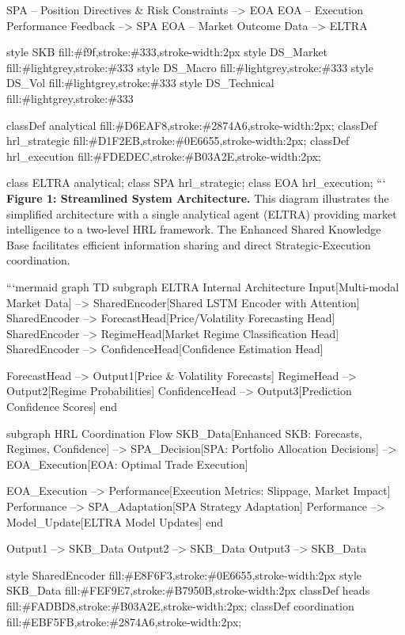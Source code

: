 \documentclass[11pt,a4paper]{article}
\begin{document}
    SPA -- Position Directives \& Risk Constraints --> EOA
    EOA -- Execution Performance Feedback --> SPA
    EOA -- Market Outcome Data --> ELTRA

    style SKB fill:\#f9f,stroke:\#333,stroke-width:2px
    style DS\_Market fill:\#lightgrey,stroke:\#333
    style DS\_Macro fill:\#lightgrey,stroke:\#333
    style DS\_Vol fill:\#lightgrey,stroke:\#333
    style DS\_Technical fill:\#lightgrey,stroke:\#333

    classDef analytical fill:\#D6EAF8,stroke:\#2874A6,stroke-width:2px;
    classDef hrl\_strategic fill:\#D1F2EB,stroke:\#0E6655,stroke-width:2px;
    classDef hrl\_execution fill:\#FDEDEC,stroke:\#B03A2E,stroke-width:2px;

    class ELTRA analytical;
    class SPA hrl\_strategic;
    class EOA hrl\_execution;
```
\textbf{Figure 1: Streamlined System Architecture.} This diagram illustrates the simplified architecture with a single analytical agent (ELTRA) providing market intelligence to a two-level HRL framework. The Enhanced Shared Knowledge Base facilitates efficient information sharing and direct Strategic-Execution coordination.

```mermaid
graph TD
    subgraph ELTRA Internal Architecture
        Input[Multi-modal Market Data] --> SharedEncoder[Shared LSTM Encoder with Attention]
        SharedEncoder --> ForecastHead[Price/Volatility Forecasting Head]
        SharedEncoder --> RegimeHead[Market Regime Classification Head]
        SharedEncoder --> ConfidenceHead[Confidence Estimation Head]
        
        ForecastHead --> Output1[Price \& Volatility Forecasts]
        RegimeHead --> Output2[Regime Probabilities]
        ConfidenceHead --> Output3[Prediction Confidence Scores]
    end

    subgraph HRL Coordination Flow
        SKB\_Data[Enhanced SKB: Forecasts, Regimes, Confidence] 
        --> SPA\_Decision[SPA: Portfolio Allocation Decisions]
        --> EOA\_Execution[EOA: Optimal Trade Execution]
        
        EOA\_Execution --> Performance[Execution Metrics: Slippage, Market Impact]
        Performance --> SPA\_Adaptation[SPA Strategy Adaptation]
        Performance --> Model\_Update[ELTRA Model Updates]
    end

    Output1 --> SKB\_Data
    Output2 --> SKB\_Data
    Output3 --> SKB\_Data

    style SharedEncoder fill:\#E8F6F3,stroke:\#0E6655,stroke-width:2px
    style SKB\_Data fill:\#FEF9E7,stroke:\#B7950B,stroke-width:2px
    classDef heads fill:\#FADBD8,stroke:\#B03A2E,stroke-width:2px;
    classDef coordination fill:\#EBF5FB,stroke:\#2874A6,stroke-width:2px;
    
\end{document}
